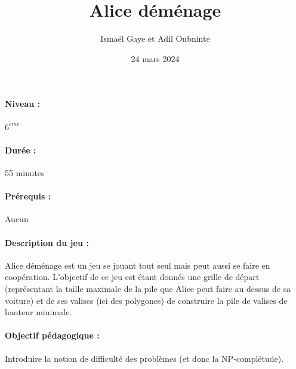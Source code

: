 \documentclass[12pt, a4paper]{article}
\begin{document}
	
	\title{Alice déménage}
	\author{Ismaël Gaye et Adil Oubninte}
	\date{24 mars 2024}
	\maketitle
	
	\paragraph*{Niveau :} $6^{\grave{e}me}$
	\paragraph*{Durée :} 55 minutes
	\paragraph*{Prérequis :} Aucun
	\paragraph*{Description du jeu :}
	Alice déménage est un jeu se jouant tout seul mais peut aussi se faire en coopération. L'objectif de ce jeu est étant donnés une grille de départ (représentant la taille maximale de la pile que Alice peut faire au dessus de sa voiture) et de ses valises (ici des polygones) de construire la pile de valises de hauteur minimale.
	
	\paragraph*{Objectif pédagogique :}
	Introduire la notion de difficulté des problèmes (et donc la NP-complétude).
	
\end{document}
